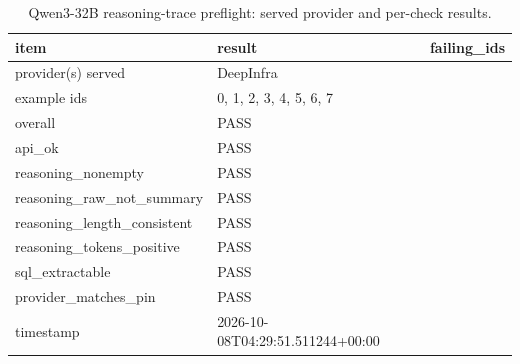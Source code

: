 \begin{table}[htbp]
\caption{Qwen3-32B reasoning-trace preflight: served provider and per-check results.}
\label{tab:task1_preflight}
\begin{tabular}{lll}
\toprule
item & result & failing\_ids \\
\midrule
provider(s) served & DeepInfra &  \\
example ids & 0, 1, 2, 3, 4, 5, 6, 7 &  \\
overall & PASS &  \\
api_ok & PASS &  \\
reasoning_nonempty & PASS &  \\
reasoning_raw_not_summary & PASS &  \\
reasoning_length_consistent & PASS &  \\
reasoning_tokens_positive & PASS &  \\
sql_extractable & PASS &  \\
provider_matches_pin & PASS &  \\
timestamp & 2026-10-08T04:29:51.511244+00:00 &  \\
\bottomrule
\end{tabular}
\end{table}
